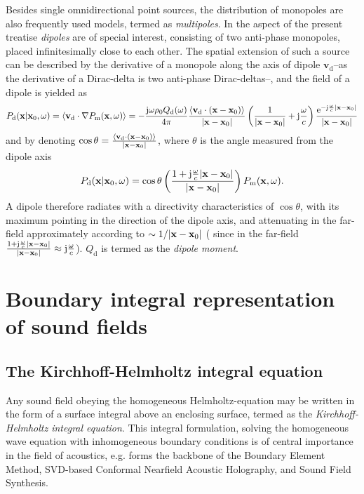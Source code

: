 \vspace{3mm}
Besides single omnidirectional point sources, the distribution of monopoles are also frequently used models, termed as \emph{multipoles}. In the aspect of the present treatise \emph{dipoles} are of special interest, consisting of two anti-phase monopoles, placed infinitesimally close to each other. The spatial extension of such a source can be described by the derivative of a monopole along the axis of dipole $\mathbf{v}_{\mathrm{d}}$--as the derivative of a Dirac-delta is two anti-phase Dirac-deltas--, and the field of a dipole is yielded as
\begin{equation}
P_{\mathrm{d}}(\mathbf{x}|\mathbf{x}_0,\omega) = \left< \mathbf{v}_{\mathrm{d}} \cdot \nabla P_{\mathrm{m}}(\mathbf{x},\omega) \right>= -\frac{\mathrm{j} \omega \rho_0 Q_\mathrm{d}(\omega)}{4\pi}\frac{\left<\mathbf{v}_{\mathrm{d}}\cdot (\mathbf{x}-\mathbf{x}_0) \right> } {|\mathbf{x}-\mathbf{x}_0|}\left(  \frac{1}{|\mathbf{x}-\mathbf{x}_0|} + \mathrm{j} \frac{\omega}{c} \right)\frac{\mathrm{e}^{-\mathrm{j} \frac{\omega}{c}|\mathbf{x}-\mathbf{x}_0|}}{|\mathbf{x}-\mathbf{x}_0|}
\end{equation}
and by denoting $\cos \theta = \frac{\left< \mathbf{v}_{\mathrm{d}}\cdot (\mathbf{x}-\mathbf{x}_0)  \right> } {|\mathbf{x}-\mathbf{x}_0|}$, where $\theta$ is the angle measured from the dipole axis 
\begin{equation}
P_{\mathrm{d}}(\mathbf{x}|\mathbf{x}_0,\omega) = \cos \theta \left( \frac{1 + \mathrm{j} \frac{\omega}{c}|\mathbf{x}-\mathbf{x}_0|}{|\mathbf{x}-\mathbf{x}_0|} \right) P_{\mathrm{m}} (\mathbf{x},\omega).
\end{equation}
A dipole therefore radiates with a directivity characteristics of $\cos \theta$, with its maximum pointing in the direction of the dipole axis, and attenuating in the far-field approximately according to $\sim 1/|\mathbf{x}-\mathbf{x}_0|$ ( since in the far-field $\frac{1 + \mathrm{j} \frac{\omega}{c}|\mathbf{x}-\mathbf{x}_0|}{|\mathbf{x}-\mathbf{x}_0|} \approx \mathrm{j} \frac{\omega}{c}$). $Q_{\mathrm{d}}$ is termed as the \emph{dipole moment}.
 
\newpage
\section{Boundary integral representation of sound fields}

\subsection{The Kirchhoff-Helmholtz integral equation}
Any sound field obeying the homogeneous Helmholtz-equation may be written in the form of a surface integral above an enclosing surface, termed as the \emph{Kirchhoff-Helmholtz integral equation}. This integral formulation, solving the homogeneous wave equation with inhomogeneous boundary conditions is of central importance in the field of acoustics, e.g. forms the backbone of the Boundary Element Method, SVD-based Conformal Nearfield Acoustic Holography, and Sound Field Synthesis.

